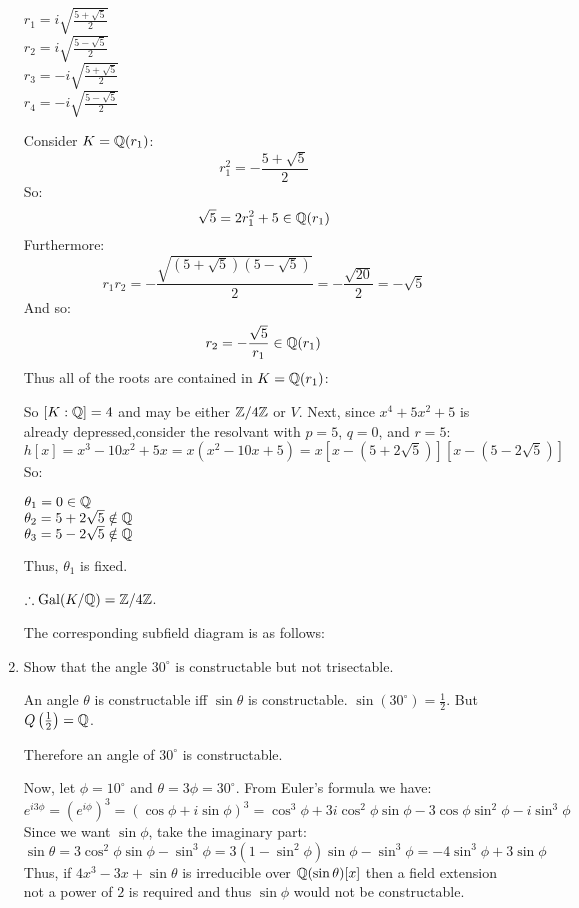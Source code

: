 \documentclass[letterpaper,12pt,fleqn]{article}
\renewcommand{\o}{\theta}
\newcommand{\p}{\phi}
\DeclareMathOperator{\Gal}{Gal}
\begin{document}
\begin{enumerate}
  $r_1=i\sqrt{\frac{5+\sqrt{5}}{2}}$ \\
  $r_2=i\sqrt{\frac{5-\sqrt{5}}{2}}$ \\
  $r_3=-i\sqrt{\frac{5+\sqrt{5}}{2}}$ \\
  $r_4=-i\sqrt{\frac{5-\sqrt{5}}{2}}$

  Consider $K=\mathbb{Q}(r_1)$:
  \[r_1^2=-\frac{5+\sqrt{5}}{2}\]
  So:
  \[\sqrt{5}=2r_1^2+5\in\mathbb{Q}(r_1)\]
  Furthermore:
  \[r_1r_2=-\frac{\sqrt{(5+\sqrt{5})(5-\sqrt{5})}}{2}=-\frac{\sqrt{20}}{2}=
  -\sqrt{5}\]
  And so:
  \[r_2=-\frac{\sqrt{5}}{r_1}\in\mathbb{Q}(r_1)\]
  Thus all of the roots are contained in $K=\mathbb{Q}(r_1)$:


  So $[K:\mathbb{Q}]=4$ and may be either $\mathbb{Z}/4\mathbb{Z}$ or $V$. Next, since $x^4+5x^2+5$ is
  already depressed,consider the resolvant with $p=5$, $q=0$, and $r=5$:
  \[h[x]=x^3-10x^2+5x=x(x^2-10x+5)=x[x-(5+2\sqrt{5})][x-(5-2\sqrt{5})]\]
  So:

  $\o_1=0\in\Q$ \\
  $\o_2=5+2\sqrt{5}\notin\Q$ \\
  $\o_3=5-2\sqrt{5}\notin\Q$

  Thus, $\o_1$ is fixed.

  $\therefore \Gal(K/\Q)=\Z/4\Z$.

  The corresponding subfield diagram is as follows:


  \bigskip

\item Show that the angle $30^{\circ}$ is constructable but not trisectable.

  An angle $\o$ is constructable iff $\sin\o$ is constructable. 
  $\sin(30^{\circ})=\frac{1}{2}$. But $Q\left(\frac{1}{2}\right)=\mathbb{Q}$.

  Therefore an angle of $30^{\circ}$ is constructable.

  Now, let $\p=10^{\circ}$ and $\o=3\p=30^{\circ}$. From Euler's formula we
  have:
  \[e^{i3\p}=(e^{i\p})^3=(\cos\p+i\sin\p)^3=
  \cos^3\p+3i\cos^2\p\sin\p-3\cos\p\sin^2\p-i\sin^3\p\]
  Since we want $\sin\p$, take the imaginary part:
  \[\sin\o=3\cos^2\p\sin\p-\sin^3\p=3(1-\sin^2\p)\sin\p-\sin^3\p=
  -4\sin^3\p+3\sin\p\]
  Thus, if $4x^3-3x+\sin\o$ is irreducible over $\Q(\sin\o)[x]$
  then a field extension not a power of $2$ is required and thus $\sin\p$
  would not be constructable.


\end{enumerate}
\end{document}
